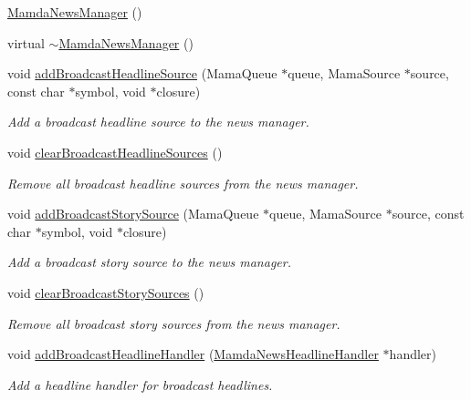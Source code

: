 \begin{CompactItemize}
\item 
\hyperlink{classWombat_1_1MamdaNewsManager_5056810c9f824cebbd5a5a71aed04bc8}{Mamda\-News\-Manager} ()
\item 
virtual \hyperlink{classWombat_1_1MamdaNewsManager_072a71cbba7a316cf286a335f2b50c1f}{$\sim$Mamda\-News\-Manager} ()
\item 
void \hyperlink{classWombat_1_1MamdaNewsManager_5f34ce74810c8d0099dea570818e2801}{add\-Broadcast\-Headline\-Source} (Mama\-Queue $\ast$queue, Mama\-Source $\ast$source, const char $\ast$symbol, void $\ast$closure)
\begin{CompactList}\small\item\em Add a broadcast headline source to the news manager. \item\end{CompactList}\item 
void \hyperlink{classWombat_1_1MamdaNewsManager_d0099a7dfa218322f47bfc7228a1b221}{clear\-Broadcast\-Headline\-Sources} ()
\begin{CompactList}\small\item\em Remove all broadcast headline sources from the news manager. \item\end{CompactList}\item 
void \hyperlink{classWombat_1_1MamdaNewsManager_0171e640fc993e3e8ed18a969b50cfce}{add\-Broadcast\-Story\-Source} (Mama\-Queue $\ast$queue, Mama\-Source $\ast$source, const char $\ast$symbol, void $\ast$closure)
\begin{CompactList}\small\item\em Add a broadcast story source to the news manager. \item\end{CompactList}\item 
void \hyperlink{classWombat_1_1MamdaNewsManager_cd90050516edb35d2032bf4d3bed6865}{clear\-Broadcast\-Story\-Sources} ()
\begin{CompactList}\small\item\em Remove all broadcast story sources from the news manager. \item\end{CompactList}\item 
void \hyperlink{classWombat_1_1MamdaNewsManager_9fc593b6b72946a4a62cfba27412417d}{add\-Broadcast\-Headline\-Handler} (\hyperlink{classWombat_1_1MamdaNewsHeadlineHandler}{Mamda\-News\-Headline\-Handler} $\ast$handler)
\begin{CompactList}\small\item\em Add a headline handler for broadcast headlines. \item\end{CompactList}\item 

\end{CompactItemize}
